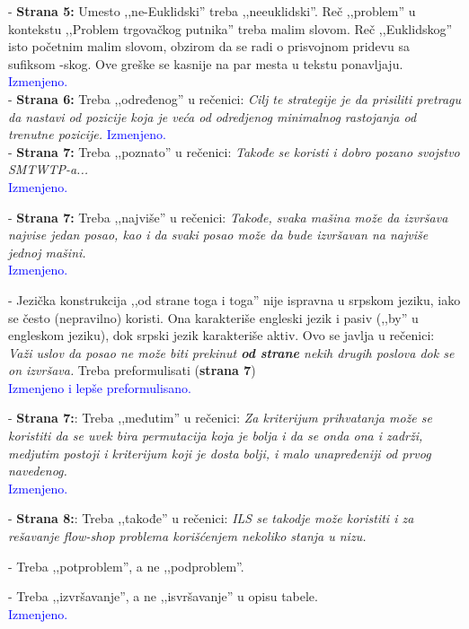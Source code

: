 \documentclass[a4paper]{report}
\newcommand{\odgovor}[1]{\textcolor{blue}{#1}}
\begin{document}
- \textbf{Strana 5:} Umesto ,,ne-Euklidski'' treba ,,neeuklidski''. Reč ,,problem'' u kontekstu ,,Problem trgovačkog putnika'' treba malim slovom. Reč ,,Euklidskog'' isto početnim malim slovom, obzirom da se radi o prisvojnom pridevu sa sufiksom -skog. Ove greške se kasnije na par mesta u tekstu ponavljaju.
\odgovor{Izmenjeno.\\}
- \textbf{Strana 6:} Treba ,,određenog'' u rečenici: {\em Cilj te strategije je da prisiliti pretragu da nastavi od pozicije koja je veća od odredjenog minimalnog rastojanja od trenutne pozicije.}
\odgovor{Izmenjeno.\\}
- \textbf{Strana 7:} Treba ,,poznato'' u rečenici: {\em Takođe se koristi i dobro pozano svojstvo SMTWTP-a...}\\
\odgovor{Izmenjeno.\\}

- \textbf{Strana 7:} Treba ,,najviše'' u rečenici: {\em Takođe, svaka mašina može da izvršava najvise jedan posao, kao i da svaki posao može da bude izvršavan na najviše jednoj mašini.}\\
\odgovor{Izmenjeno.\\}

- Jezička konstrukcija ,,od strane toga i toga'' nije ispravna u srpskom jeziku, iako se često (nepravilno) koristi. Ona karakteriše engleski jezik i pasiv (,,by'' u engleskom jeziku), dok srpski jezik karakteriše aktiv.
Ovo se javlja u rečenici: {\em Važi uslov da posao ne može biti prekinut \textbf{od strane} nekih drugih poslova dok se on izvršava.} Treba preformulisati (\textbf{strana 7})\\
\odgovor{Izmenjeno i lepše preformulisano.\\}

- \textbf{Strana 7:}: Treba ,,međutim'' u rečenici: {\em Za kriterijum prihvatanja može se koristiti da se uvek bira permutacija koja je bolja i da se onda ona i zadrži, medjutim postoji i kriterijum koji je dosta bolji, i malo unapređeniji od prvog navedenog.}\\
\odgovor{Izmenjeno.\\}

- \textbf{Strana 8:}: Treba ,,takođe'' u rečenici: {\em ILS se takodje može koristiti i za rešavanje flow-shop problema korišćenjem nekoliko stanja u nizu.}

- Treba ,,potproblem'', a ne ,,podproblem''.

- Treba ,,izvršavanje'', a ne ,,isvršavanje'' u opisu tabele.\\
\odgovor{Izmenjeno.\\}
\end{document}

